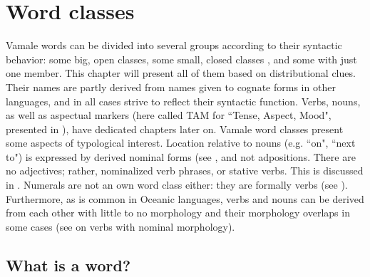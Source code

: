 \chapter{Word classes} %
\label{ChapterWoCla} %

Vamale words can be divided into several groups according to their syntactic behavior: some big, open classes, some small, closed classes%
, and some with just one member. This chapter will present all of them based on distributional clues. Their names are partly derived from names given to cognate forms in other languages, and in all cases strive to reflect their syntactic function. Verbs, nouns, as well as aspectual markers (here called TAM for ``Tense, Aspect, Mood", presented in ), have dedicated chapters later on. Vamale word classes present some aspects of typological interest. Location relative to nouns (e.g. ``on", ``next to") is expressed by derived nominal forms (see , and not adpositions. There are no adjectives; rather, nominalized verb phrases, or stative verbs. This is discussed in . Numerals are not an own word class either: they are formally verbs (see ). Furthermore, as is common in Oceanic languages, verbs and nouns can be derived from each other with little to no morphology and their morphology overlaps in some cases (see  on verbs with nominal morphology). 


\section{What is a word?}

